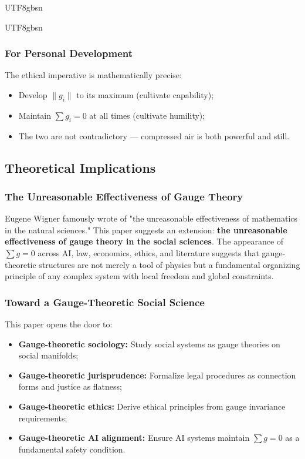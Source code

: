 \documentclass[11pt,a4paper]{article}
\begin{document}
\begin{CJK}{UTF8}{gbsn}
{\begin{CJK}{UTF8}{gbsn}
\subsubsection{For Personal Development}
The ethical imperative is mathematically precise:
\begin{itemize}
    \item Develop $\|g_i\|$ to its maximum (cultivate capability);
    \item Maintain $\sum g_i = 0$ at all times (cultivate humility);
    \item The two are not contradictory --- compressed air is both powerful and still.
\end{itemize}
\subsection{Theoretical Implications}
\subsubsection{The Unreasonable Effectiveness of Gauge Theory}
Eugene Wigner famously wrote of "the unreasonable effectiveness of mathematics
in the natural sciences." This paper suggests an extension: \textbf{the unreasonable
effectiveness of gauge theory in the social sciences}. The appearance of $\sum g = 0$
across AI, law, economics, ethics, and literature suggests that gauge-theoretic
structures are not merely a tool of physics but a fundamental organizing principle
of any complex system with local freedom and global constraints.
\subsubsection{Toward a Gauge-Theoretic Social Science}
This paper opens the door to:
\begin{itemize}
    \item \textbf{Gauge-theoretic sociology:} Study social systems as gauge theories
          on social manifolds;
    \item \textbf{Gauge-theoretic jurisprudence:} Formalize legal procedures as
          connection forms and justice as flatness;
    \item \textbf{Gauge-theoretic ethics:} Derive ethical principles from gauge
          invariance requirements;
    \item \textbf{Gauge-theoretic AI alignment:} Ensure AI systems maintain
          $\sum g = 0$ as a fundamental safety condition.
\end{itemize}

\end{CJK}}
\end{CJK}
\end{document}
